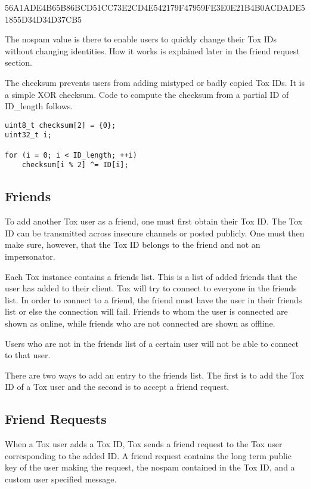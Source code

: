 \documentclass{tox}
\begin{document}
56A1ADE4B65B86BCD51CC73E2CD4E542179F47959FE3E0E21B4B0ACDADE51855D34D34D37CB5

The nospam value is there to enable users to quickly change their Tox IDs 
without changing identities. How it works is explained later in the friend 
request section.

The checksum prevents users from adding mistyped or badly copied Tox IDs. It is 
a simple XOR checksum. Code to compute the checksum from a partial ID of 
ID\_length follows.

\begin{lstlisting}
uint8_t checksum[2] = {0};
uint32_t i;

for (i = 0; i < ID_length; ++i)
    checksum[i % 2] ^= ID[i];

\end{lstlisting}

\subsection{Friends}

To add another Tox user as a friend, one must first obtain their Tox ID. The
Tox ID can be transmitted across insecure channels or posted publicly. One 
must then make sure, however, that the Tox ID belongs to the friend and 
not an impersonator.

Each Tox instance contains a friends list. This is a list of added friends 
that the user has added to their client. Tox will try to connect to everyone in 
the friends list. In order to connect to a friend, the friend must have the 
user in their friends list or else the connection will fail. Friends to whom the 
user is connected are shown as online, while friends who are not connected are 
shown as offline.

Users who are not in the friends list of a certain user will not be able to connect
to that user.

There are two ways to add an entry to the friends list. The first is to add the 
Tox ID of a Tox user and the second is to accept a friend request.

\subsection{Friend Requests}

When a Tox user adds a Tox ID, Tox sends a friend request to the Tox user 
corresponding to the added ID. A friend request contains the long term public 
key of the user making the request, the nospam contained in the Tox ID, and a 
custom user specified message.
\end{document}
